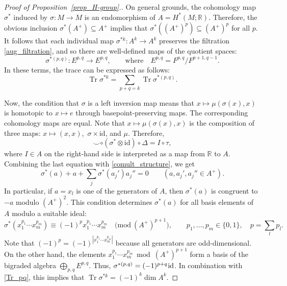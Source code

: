\documentclass[12pt]{article}
\newcommand{\RR}{\mathbb{R}}
\newcommand{\ts}{\mkern1mu}
\DeclareMathOperator{\Tr}{Tr}
\newcommand{\id}{\mathrm{id}}
\newtheorem[definition]{Definition}[Theorem]{Definition}
\newtheorem[remark]{Example}[Theorem]{Example}
\newtheorem[remark]{Remark}[Theorem]{Remark}
\newtheorem[remark]{Question}[Theorem]{Open question}
\newtheorem*[definition]{definition}{Definition}
\newtheorem*[remark]{example}{Example}
\newtheorem*[remark]{remark}{Remark}
\newtheorem*[remark]{question}{Open question}
\numberwithin{equation}{section}
\begin{document}
\begin{proof}[Proof of Proposition~\ref{prop_H-group}.]
On general grounds, the cohomology map $\sigma^*$ induced by $\sigma\colon M\to M$ is an endomorphism of $A=H^*(M;\RR)$. Therefore, the obvious inclusion $\sigma^*(A^+)\subseteq A^+$ implies that $\sigma^*((A^+)^p)\subseteq(A^+)^p$ for all $p$. It follows that each individual map $\sigma^{*k}\colon A^k\to A^k$ preserves the filtration \eqref{aug_filtration}, and so there are well-defined maps of the quotient spaces:
\begin{equation}
\sigma^{*(p,q)}\colon E^{p,q}\to E^{p,q},\qquad
\text{where}\quad E^{p,q}=F^{p,q}/F^{p+1,q-1}.
\end{equation}
In these terms, the trace can be expressed as follows:
\begin{equation}\label{Tr_pq}
\Tr\sigma^{*k}=\sum_{p+q=k}\Tr\sigma^{*(p,q)}.
\end{equation}

Now, the condition that $\sigma$ is a left inversion map means that $x\mapsto\mu(\sigma(x),x)$ is homotopic to $x\mapsto e$ through basepoint-preserving maps. The corresponding cohomology maps are equal. Note that $x\mapsto\mu(\sigma(x),x)$ is the composition of three maps: $x\mapsto(x,x)$,\, $\sigma\times\id$, and $\mu$. Therefore,
\begin{equation}
{\smile}\circ(\sigma^*\otimes\id)\circ\Delta = I\circ\tau,
\end{equation}
where $I\in A$ on the right-hand side is interpreted as a map from $\RR$ to $A$. Combining the last equation with \eqref{comult_structure}, we get
\begin{equation}
\sigma^*(a)+a+\sum_{j}\sigma^*(a_j')a_j'' = 0\qquad (a,a_j',a_j''\in A^+).
\end{equation}
In particular, if $a=x_l$ is one of the generators of $A$, then $\sigma^*(a)$ is congruent to $-a$ modulo $(A^+)^2$. This condition determines $\sigma^*(a)$ for all basis elements of $A$ modulo a suitable ideal:
\begin{equation}
\sigma^*(x_1^{p_1}\cdots x_m^{p_m})
\equiv (-1)^{p}x_1^{p_1}\cdots x_m^{p_m}\quad
\bigl(\mathrm{mod}\:(A^+)^{p+1}\bigr),\qquad
p_1,\ldots,p_m\in\{0,1\},\quad p=\sum_{l}p_l.
\end{equation}
Note that $(-1)^{p}=(-1)^{|x_1^{p_1}\cdots x_m^{p_m}|}$ because all generators are odd-dimensional. On the other hand, the elements $x_1^{p_1}\cdots x_m^{p_m}\bmod (A^+)^{p+1}$ form a basis of the bigraded algebra $\bigoplus_{p,q}E^{p,q}$. Thus, $\sigma^{*(p,q)}=(-1)^{p+q}\ts\id$. In combination with \eqref{Tr_pq}, this implies that $\Tr\sigma^{*k}=(-1)^k\dim A^k$.
\end{proof}
\end{document}
